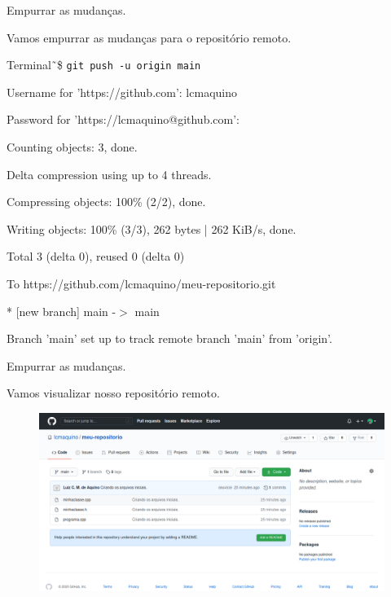 \documentclass[brazil,aspectratio=169]{beamer}
\newcommand{\terminal}[1]{\textcolor{my-green}{\texttt{#1}}}
\begin{document}
\begin{frame}{Empurrar as mudanças.}

  Vamos empurrar as mudanças para o repositório remoto.

  \begin{exampleblock}{Terminal}
    \~\,\$ \terminal{git push -u origin main}

    Username for 'https://github.com': lcmaquino

    Password for 'https://lcmaquino@github.com':

    Counting objects: 3, done.

    Delta compression using up to 4 threads.

    Compressing objects: 100\% (2/2), done.

    Writing objects: 100\% (3/3), 262 bytes | 262 KiB/s, done.

    Total 3 (delta 0), reused 0 (delta 0)

    To https://github.com/lcmaquino/meu-repositorio.git

    * [new branch] main -$>$ main

    Branch 'main' set up to track remote branch 'main' from 'origin'.
  \end{exampleblock}

\end{frame}

\begin{frame}{Empurrar as mudanças.}

  Vamos visualizar nosso repositório remoto.

  \begin{figure}
    \centering
    \includegraphics[scale=0.3]{imagens/novo-repositorio-github-4}
  \end{figure}
  
\end{frame}
\end{document}
